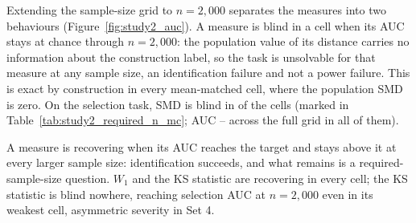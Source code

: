 \documentclass[AMA,Times1COL]{WileyNJDv5}
\begin{document}
Extending the sample-size grid to $n = 2{,}000$ separates the measures into two behaviours (Figure~\ref{fig:study2_auc}). A measure is blind in a cell when its AUC stays at chance through $n = 2{,}000$: the population value of its distance carries no information about the construction label, so the task is unsolvable for that measure at any sample size, an identification failure and not a power failure. This is exact by construction in every mean-matched cell, where the population SMD is zero. On the selection task, SMD is blind in  of the  cells (marked in Table~\ref{tab:study2_required_n_mc}; AUC -- across the full grid in all of them).

A measure is recovering when its AUC reaches the target and stays above it at every larger sample size: identification succeeds, and what remains is a required-sample-size question. $W_1$ and the KS statistic are recovering in every cell; the KS statistic is blind nowhere, reaching selection AUC  at $n = 2{,}000$ even in its weakest cell, asymmetric severity in Set 4.
\end{document}
